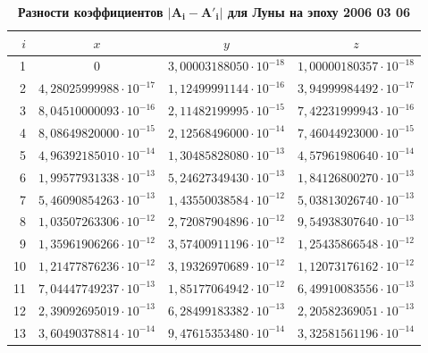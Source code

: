 \begin{table}[p!]
\small \centering
\caption{\bf Разности коэффициентов $\boldsymbol{|A_i-A'_i|}$ для Луны на эпоху 2006 03 06}\vspace{-3mm}
\begin{tabular}{r|c|c|c}
\hline	
\footnotesize $i$ & \footnotesize 	$x$	&\footnotesize 	$y$	&\footnotesize 	$z$	\\
\hline
\rule{0mm}{12pt}%
1	&$	0	$&$	3,00003188050\cdot 10^{-18}	$&$	1,00000180357\cdot 10^{-18}	$\\
2	&$	4,28025999988\cdot 10^{-17}	$&$	1,12499991144\cdot 10^{-16}	$&$	3,94999984492\cdot 10^{-17}	 $\\
3	&$	8,04510000093\cdot 10^{-16}	$&$	2,11482199995\cdot 10^{-15}	$&$	7,42231999943\cdot 10^{-16}	 $\\
4	&$	8,08649820000\cdot 10^{-15}	$&$	2,12568496000\cdot 10^{-14}	$&$	7,46044923000\cdot 10^{-15}	 $\\
5	&$	4,96392185010\cdot 10^{-14}	$&$	1,30485828080\cdot 10^{-13}	$&$	4,57961980640\cdot 10^{-14}	 $\\
6	&$	1,99577931338\cdot 10^{-13}	$&$	5,24627349430\cdot 10^{-13}	$&$	1,84126800270\cdot 10^{-13}	 $\\
7	&$	5,46090854263\cdot 10^{-13}	$&$	1,43550038584\cdot 10^{-12}	$&$	5,03813026740\cdot 10^{-13}	 $\\
8	&$	1,03507263306\cdot 10^{-12}	$&$	2,72087904896\cdot 10^{-12}	$&$	9,54938307640\cdot 10^{-13}	 $\\
9	&$	1,35961906266\cdot 10^{-12}	$&$	3,57400911196\cdot 10^{-12}	$&$	1,25435866548\cdot 10^{-12}	 $\\
10	&$	1,21477876236\cdot 10^{-12}	$&$	3,19326970689\cdot 10^{-12}	$&$	1,12073176162\cdot 10^{-12}	$\\
11	&$	7,04447749237\cdot 10^{-13}	$&$	1,85177064942\cdot 10^{-12}	$&$	6,49910083556\cdot 10^{-13}	$\\
12	&$	2,39092695019\cdot 10^{-13}	$&$	6,28499183382\cdot 10^{-13}	$&$	2,20582369051\cdot 10^{-13}	$\\
13	&$	3,60490378814\cdot 10^{-14}	$&$	9,47615353480\cdot 10^{-14}	$&$	3,32581561196\cdot 10^{-14}	$\\
\hline
\end{tabular}

\bigskip


\end{table}
